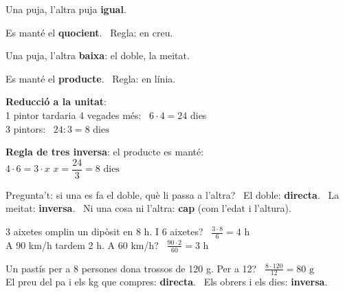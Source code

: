 \documentclass[11pt,a4paper]{article}
\newcommand{\cA}[1]{{\color{fmA}#1}}\newcommand{\cB}[1]{{\color{fmB}#1}}\newcommand{\cK}[1]{{\color{fmK}#1}}\newcommand{\cR}[1]{{\color{fmR}#1}}\newcommand{\cV}[1]{{\color{fmV}#1}}
\begin{document}
\vfill
\begin{tcbraster}[raster columns=2,raster equal height,raster column skip=10pt]
\begin{tcolorbox}[fmbase,colback=fmK!8,colframe=fmK,coltitle=white,title={\faArrowUp\ \ Directa}]
Una puja, l'altra puja \textbf{igual}.\par\smallskip
Es manté el \textbf{quocient}. \ Regla: en creu.
\end{tcolorbox}
\begin{tcolorbox}[fmbase,colback=fmB!8,colframe=fmB,coltitle=white,title={\faArrowDown\ \ Inversa}]
Una puja, l'altra \textbf{baixa}: el doble, la meitat.\par\smallskip
Es manté el \textbf{producte}. \ Regla: en línia.
\end{tcolorbox}
\end{tcbraster}

\vfill
\begin{exemple}
\begin{minipage}[t]{0.48\linewidth}
\textbf{\cA{Reducció a la unitat}}:\\[3pt]
1 pintor tardaria 4 vegades més: \ $6\cdot4=24$ dies\\[2pt]
3 pintors: \ $24:3=\boxed{8\text{ dies}}$
\end{minipage}\hfill
\begin{minipage}[t]{0.49\linewidth}
\textbf{\cB{Regla de tres inversa}}: el producte es manté:\\[3pt]
$4\cdot6=3\cdot x$ \quad $x=\dfrac{24}{3}=\boxed{8\text{ dies}}$
\end{minipage}
\end{exemple}

\vfill
\begin{compte}
Pregunta't: si una es fa el doble, què li passa a l'altra? \ El doble: \textbf{directa}. \ La meitat: \textbf{inversa}. \ Ni una cosa ni l'altra: \textbf{cap} (com l'edat i l'altura).
\end{compte}

\vfill
\begin{exemple}[Exemples]
\begin{minipage}[t]{0.48\linewidth}
3 aixetes omplin un dipòsit en 8 h. I 6 aixetes? \ $\frac{3\cdot8}{6}=\boxed{4\text{ h}}$\\[4pt]
A 90 km/h tardem 2 h. A 60 km/h? \ $\frac{90\cdot2}{60}=\boxed{3\text{ h}}$
\end{minipage}\hfill
\begin{minipage}[t]{0.49\linewidth}
Un pastís per a 8 persones dona trossos de 120 g. Per a 12? \ $\frac{8\cdot120}{12}=\boxed{80\text{ g}}$\\[4pt]
El preu del pa i els kg que compres: \textbf{directa}. \ Els obrers i els dies: \textbf{inversa}.
\end{minipage}
\end{exemple}
\end{document}
